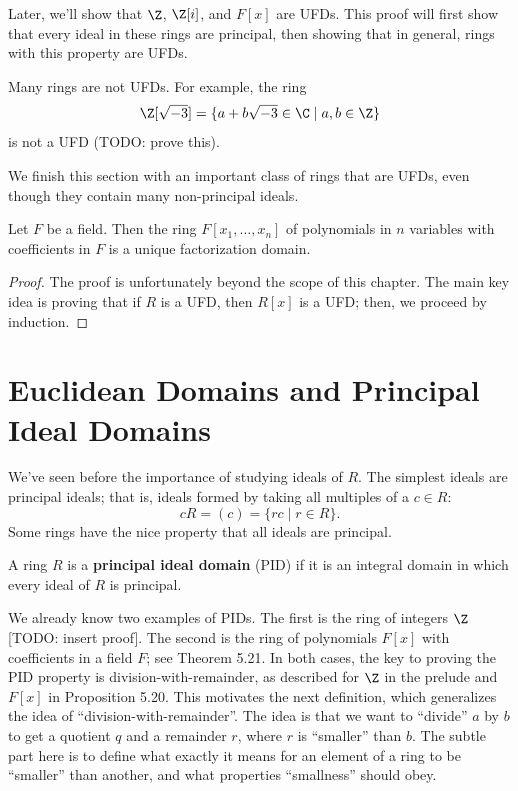 \documentclass[math1530-lecture-notes]{subfiles}
\begin{document}
Later, we'll show that $\Z$, $\Z[i]$, and $F[x]$ are UFDs. This proof will first show that every
ideal in these rings are principal, then showing that in general, rings with this property are UFDs.

Many rings are not UFDs. For example, the ring \[
  \Z[\sqrt{-3}]=\{a+b\sqrt{-3}\in \C\mid a,b\in \Z \} 
\] is not a UFD (TODO: prove this).

We finish this section with an important class of rings that are UFDs, even though they contain many
non-principal ideals.
\begin{theorem}{}
  Let $F$ be a field. Then the ring $F[x_1,\ldots,x_n]$ of polynomials in $n$ variables with
  coefficients in $F$ is a unique factorization domain. 
\end{theorem}
\begin{proof}[Proof]
  The proof is unfortunately beyond the scope of this chapter. The main key idea is proving that if
  $R$ is a UFD, then $R[x]$ is a UFD; then, we proceed by induction.
\end{proof}

\section{Euclidean Domains and Principal Ideal Domains}

We've seen before the importance of studying ideals of $R$. The simplest ideals are principal
ideals; that is, ideals formed by taking all multiples of a $c\in R$: \[
  cR=(c)=\{rc\mid r\in R\} 
.\] Some rings have the nice property that all ideals are principal.
\begin{definition}{}
  A ring $R$ is a \textbf{principal ideal domain} (PID) if it is an integral domain in which every
  ideal of $R$ is principal.
\end{definition}

We already know two examples of PIDs. The first is the ring of integers $\Z$ [TODO: insert proof].
The second is the ring of polynomials $F[x]$ with coefficients in a field $F$; see Theorem 5.21. In
both cases, the key to proving the PID property is division-with-remainder, as described for $\Z$ in
the prelude and $F[x]$ in Proposition 5.20. This motivates the next definition, which generalizes
the idea of ``division-with-remainder''. The idea is that we want to ``divide'' $a$ by $b$ to get a
quotient $q$ and a remainder $r$, where $r$ is ``smaller'' than $b$. The subtle part here is to
define what exactly it means for an element of a ring to be ``smaller'' than another, and what
properties ``smallness'' should obey.
\end{document}
